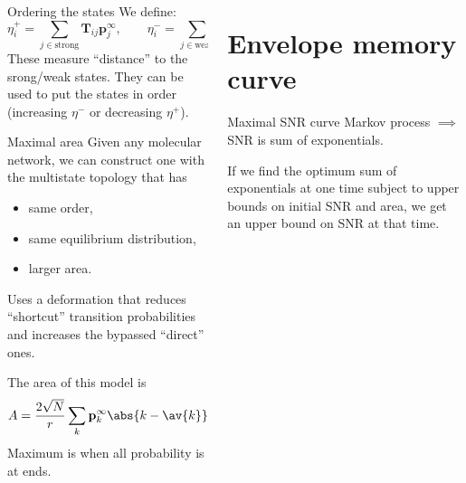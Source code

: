 \documentclass[final,hyperref={pdfpagelabels=false,bookmarks=false}]{beamer}
\newcommand{\net}{molecular network}
\newcommand{\eq}{\mathbf{p}^\infty}
\newcommand{\fpt}{\mathbf{T}}
\begin{document}
\begin{frame}{}
\begin{columns}[t]
\begin{column}{0.32\linewidth}
\begin{block}{Ordering the states}
 \vp We define:
 \begin{equation*}
   \eta^+_i = \sum_{j\in\text{strong}} \fpt_{ij} \eq_j,
   \qquad
   \eta^-_i = \sum_{j\in\text{weak}} \fpt_{ij} \eq_j.
 \end{equation*}
 These measure ``distance'' to the srong/weak states.
 They can be used to put the states in order (increasing $\eta^-$ or decreasing $\eta^+$).
%
\end{block}


\begin{block}{Maximal area}
%
 Given any \net, we can construct one with the multistate topology that has
 \begin{itemize}
   \item same order,
   \item same equilibrium distribution,
   \item larger area.
 \end{itemize}
 Uses a deformation that reduces ``shortcut'' transition probabilities and increases the bypassed ``direct'' ones.

 \vp The area of this model is
 \begin{equation*}
   A = \frac{2\sqrt{N}}{r}\sum_k \eq_k \abs{k-\av{k}}.
 \end{equation*}
 Maximum is when all probability is at ends.
%
\end{block}







\end{column}

\begin{column}{0.32\linewidth}

\section{Envelope memory curve}



\begin{block}{Maximal SNR curve}
%
 Markov process $\implies$ SNR is sum of exponentials.
 
 \vp If we find the optimum sum of exponentials \alert{at one time} subject to upper bounds on initial SNR and area,
 we get an upper bound on SNR at that time.
 

\end{block}
\end{column}
\end{columns}
\end{frame}
\end{document}
